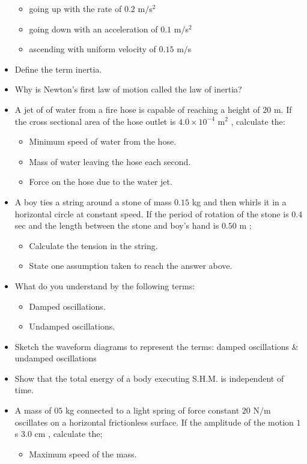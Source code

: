 \documentclass{article}
\begin{document}
\begin{itemize}
\begin{itemize}
\item going up with the rate of $ 0.2$ m$/$s$ ^{2}$
\item going down with an acceleration of $ 0.1$ m$/$s$ ^{2}$
\item ascending with uniform velocity of $ 0.15$ m$/$s
\end{itemize}
\item Define the term inertia.
\item Why is Newton’s first law of motion called the law of inertia?
\item  A jet of of water from a fire hose is capable of reaching a height of $ 20$ m.  If the cross sectional area of the hose outlet is $ 4.0	\times 10^{-4}$ m$ ^{2}$ , calculate the:
 \begin{itemize}
\item Minimum speed of water from the hose.
\item Mass of water leaving the hose each second.
\item Force on the hose due to the water jet.
\end{itemize}
\item A boy ties a string around a stone of mass $ 0.15$ kg and then whirls it in a horizontal circle at constant speed. If the period of rotation of the stone is $ 0.4$ sec and the length between the stone and boy’s hand is $ 0.50$ m ;
 \begin{itemize}
\item Calculate the tension in the string. 
\item State one assumption taken to reach the answer above.
\end{itemize}
\item What do you understand by the following terms: 
 \begin{itemize}
\item Damped oscillations. 
\item Undamped oscillations.
\end{itemize}
\item Sketch the waveform diagrams to represent the terms: damped oscillations & undamped oscillations
\item Show that the total energy of a body executing S.H.M. is independent of time.
\item A mass of $ 05$ kg connected to a light spring of force constant $ 20$ N$/$m oscillates on a  horizontal frictionless surface. If the amplitude of the motion $ 1$ s $ 3.0$ cm , calculate the;
 \begin{itemize}
\item Maximum speed of the mass.

\end{itemize}
\end{itemize}
\end{document}
